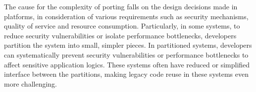 The cause for the complexity of porting
falls on the design decisions made in platforms,
in consideration of various requirements
such as security mechanisms, quality of service and resource consumption.
Particularly,
in some systems, 
to reduce security vulnerabilities or isolate performance bottlenecks,
developers partition the system into
small, simpler pieces.
In partitioned systems,
developers can systematically prevent
security vulnerabilities or performance bottlenecks
to affect sensitive application logics.
These systems often have
reduced or simplified interface between the partitions,
making legacy code reuse
in these systems even more challenging.









